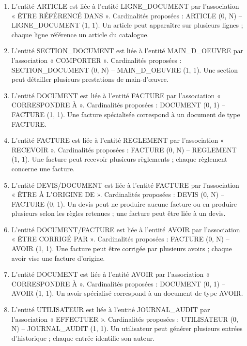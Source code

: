 \documentclass[11pt,a4paper]{article}
\begin{document}
\begin{enumerate}[leftmargin=*,itemsep=4pt]
  (0, N) -- LIGNE\_DOCUMENT (1, 1). Une section peut contenir plusieurs
  lignes ; chaque ligne appartient à une section.
\item L'entité ARTICLE est liée à l'entité LIGNE\_DOCUMENT par l'association
  « ÊTRE RÉFÉRENCÉ DANS ». Cardinalités proposées : ARTICLE (0, N) --
  LIGNE\_DOCUMENT (1, 1). Un article peut apparaître sur plusieurs lignes ;
  chaque ligne référence un article du catalogue.
\item L'entité SECTION\_DOCUMENT est liée à l'entité MAIN\_D\_OEUVRE par
  l'association « COMPORTER ». Cardinalités proposées : SECTION\_DOCUMENT
  (0, N) -- MAIN\_D\_OEUVRE (1, 1). Une section peut détailler plusieurs
  prestations de main-d'œuvre.
\item L'entité DOCUMENT est liée à l'entité FACTURE par l'association
  « CORRESPONDRE À ». Cardinalités proposées : DOCUMENT (0, 1) -- FACTURE
  (1, 1). Une facture spécialisée correspond à un document de type FACTURE.
\item L'entité FACTURE est liée à l'entité REGLEMENT par l'association
  « RECEVOIR ». Cardinalités proposées : FACTURE (0, N) -- REGLEMENT (1, 1).
  Une facture peut recevoir plusieurs règlements ; chaque règlement concerne
  une facture.
\item L'entité DEVIS/DOCUMENT est liée à l'entité FACTURE par l'association
  « ÊTRE À L'ORIGINE DE ». Cardinalités proposées : DEVIS (0, N) -- FACTURE
  (0, 1). Un devis peut ne produire aucune facture ou en produire plusieurs
  selon les règles retenues ; une facture peut être liée à un devis.
\item L'entité DOCUMENT/FACTURE est liée à l'entité AVOIR par l'association
  « ÊTRE CORRIGÉ PAR ». Cardinalités proposées : FACTURE (0, N) -- AVOIR
  (1, 1). Une facture peut être corrigée par plusieurs avoirs ; chaque avoir
  vise une facture d'origine.
\item L'entité DOCUMENT est liée à l'entité AVOIR par l'association
  « CORRESPONDRE À ». Cardinalités proposées : DOCUMENT (0, 1) -- AVOIR
  (1, 1). Un avoir spécialisé correspond à un document de type AVOIR.
\item L'entité UTILISATEUR est liée à l'entité JOURNAL\_AUDIT par
  l'association « EFFECTUER ». Cardinalités proposées : UTILISATEUR (0, N) --
  JOURNAL\_AUDIT (1, 1). Un utilisateur peut générer plusieurs entrées
  d'historique ; chaque entrée identifie son auteur.
\end{enumerate}

\end{document}
